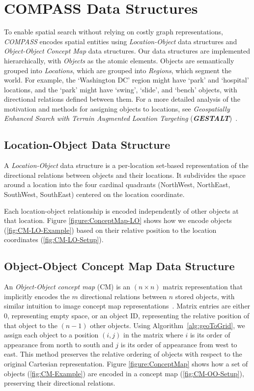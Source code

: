 \section{COMPASS Data Structures}
\label{section:data_structures}
To enable spatial search without relying on costly graph representations, \emph{COMPASS} encodes spatial entities using \textit{Location-Object} data structures and \textit{Object-Object} \textit{Concept Map} data structures. 
Our data structures are implemented hierarchically, with \textit{Objects} as the atomic elements. 
Objects are semantically grouped into \textit{Locations}, which are grouped into \textit{Regions}, which segment the world. 
For example, the `Washington DC' region might have `park' and `hospital' locations, and the `park' might have `swing', `slide', and `bench' objects, with directional relations defined between them. 
For a more detailed analysis of the motivation and methods for assigning objects to locations, see \textit{Geospatially Enhanced Search with Terrain Augmented Location Targeting} (\textbf{\textit{GESTALT}})~\cite{Osul2023}.

\subsection{Location-Object Data Structure}
A \textit{Location-Object} data structure is a per-location set-based representation of the directional relations between objects and their locations.
It subdivides the space around a location into the four cardinal quadrants (NorthWest, NorthEast, SouthWest, SouthEast) centered on the location coordinate.

Each location-object relationship is encoded independently of other objects at that location.
Figure \ref{figure:ConceptMap-LO} shows how we encode objects (\ref{fig:CM-LO-Example}) based on their relative position to the location coordinates (\ref{fig:CM-LO-Setup}).


\subsection{Object-Object Concept Map Data Structure}

An \textit{Object-Object concept map} (CM) is an $(n\times n)$ matrix representation that implicitly encodes the $m$ directional relations between $n$ stored objects, with similar intuition to image concept map representations~\cite{Xu2010}.
Matrix entries are either $0$, representing empty space, or an object ID, representing the relative position of that object to the $(n-1)$ other objects.
Using Algorithm~\ref{alg:geoToGrid}, we assign each object to a position $(i,j)$ in the matrix where $i$ is its order of appearance from north to south and $j$ is its order of appearance from west to east.
This method preserves the relative ordering of objects with respect to the original Cartesian representation.
Figure \ref{figure:ConceptMap} shows how a set of objects (\ref{fig:CM-Example}) are encoded in a concept map (\ref{fig:CM-OO-Setup}), preserving their directional relations. 


